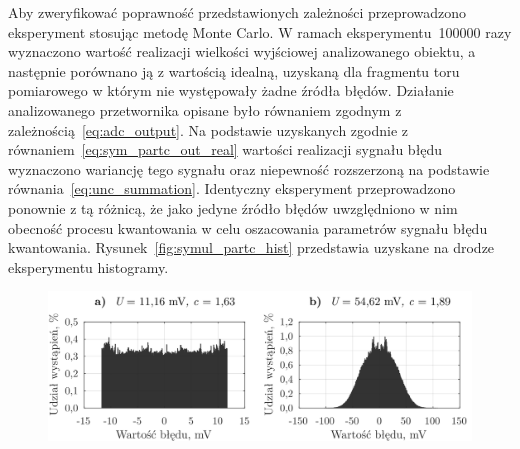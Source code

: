 Aby zweryfikować poprawność przedstawionych zależności przeprowadzono eksperyment stosując metodę Monte Carlo. W ramach eksperymentu~\num{100000} razy wyznaczono wartość realizacji wielkości wyjściowej analizowanego obiektu, a następnie porównano ją z wartością idealną, uzyskaną dla fragmentu toru pomiarowego w którym nie występowały żadne źródła błędów. Działanie analizowanego przetwornika opisane było równaniem zgodnym z zależnością~\eqref{eq:adc_output}. Na podstawie uzyskanych zgodnie z równaniem~\eqref{eq:sym_partc_out_real} wartości realizacji sygnału błędu wyznaczono wariancję tego sygnału oraz niepewność rozszerzoną na podstawie równania~\eqref{eq:unc_summation}. Identyczny eksperyment przeprowadzono ponownie z tą różnicą, że jako jedyne źródło błędów uwzględniono w nim obecność procesu kwantowania w celu oszacowania parametrów sygnału błędu kwantowania. Rysunek~\ref{fig:symul_partc_hist} przedstawia uzyskane na drodze eksperymentu histogramy.

\begin{figure}[htb!]
\includegraphics{obrazki/hist_part_c}
\end{figure}

